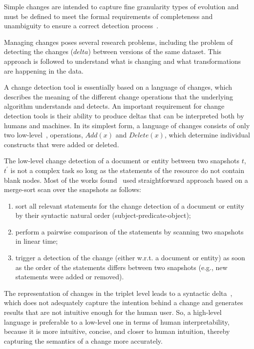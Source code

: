 \documentclass[sw]{iosart2x}
\begin{document}
Simple changes are intended to capture fine granularity types of evolution and must be defined to meet the formal requirements of completeness and unambiguity to ensure a correct detection process~\cite{PapavasileiouFFKC13}. 

Managing changes poses several research problems, including the problem of detecting the changes ($delta$) between versions of the same dataset. This approach is followed to understand what is changing and what transformations are happening in the data.

A change detection tool is essentially based on a language of changes, which describes the meaning of the different change operations that the underlying algorithm understands and detects. An important requirement for change detection tools is their ability to produce deltas that can be interpreted both by humans and machines. In its simplest form, a language of changes consists of only two low-level~\cite{UmbrichHHPD10}, \cite{KaferAUOH13} operations, $Add(x)$ and $Delete(x)$, which determine individual constructs that were added or deleted. 

The low-level change detection of a document or entity between two snapshots $t$, $t^\prime$ is not a complex task so long as the statements of the resource do not contain blank nodes. Most of the works found~\cite{UmbrichHHPD10} \cite{UmbrichKL10} used straightforward approach based on a merge-sort scan over the snapshots as follows:

\begin{enumerate}
	\item sort all relevant statements for the change detection of a document or entity by their syntactic natural order (subject-predicate-object);
	\item perform a pairwise comparison of the statements by scanning two snapshots in linear time;
	\item trigger a detection of the change (either w.r.t. a document or entity) as soon as the order of the statements differs between two snapshots (e.g., new statements were added or removed).
\end{enumerate}

The representation of changes in the triplet level leads to a syntactic delta~\cite{ZeginisTC11}, which does not adequately capture the intention behind a change and generates results that are not intuitive enough for the human user. So, a high-level language is preferable to a low-level one in terms of human interpretability, because it is more intuitive, concise, and closer to human intuition, thereby capturing the semantics of a change more accurately.
\end{document}
